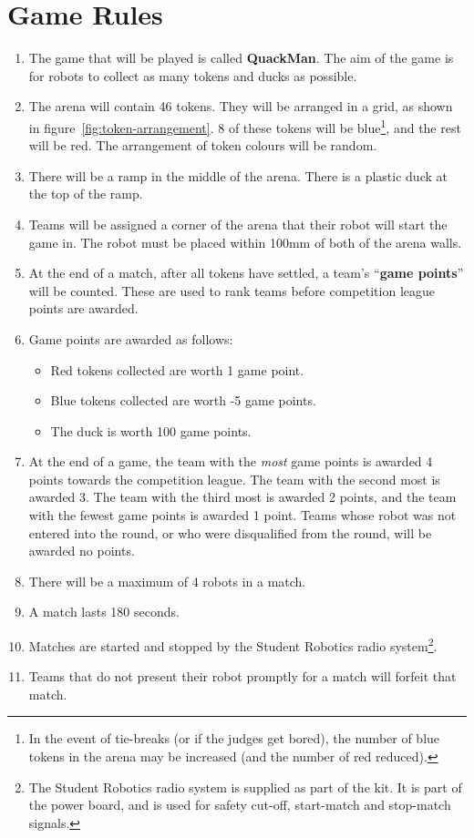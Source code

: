 \section {Game Rules}
\label{game-rules}

\begin{enumerate}
\item The game that will be played is called \textbf{QuackMan}.  The aim of the game is for robots to collect as many tokens and ducks as possible.
\item The arena will contain 46 tokens.  They will be arranged in a grid, as shown in figure~\ref{fig:token-arrangement}.  8 of these tokens will be blue\footnote{In the event of tie-breaks (or if the judges get bored), the number of blue tokens in the arena may be increased (and the number of red reduced).}, and the rest will be red.  The arrangement of token colours will be random.
\item There will be a ramp in the middle of the arena.  There is a plastic duck at the top of the ramp.
\item Teams will be assigned a corner of the arena that their robot will start the game in.  The robot must be placed within 100mm of both of the arena walls.
\item At the end of a match, after all tokens have settled, a team's ``\textbf{game points}'' will be counted.
 These are used to rank teams before competition league points are awarded.

\item Game points are awarded as follows:
\begin{itemize}
\item Red tokens collected are worth 1 game point.
\item Blue tokens collected are worth -5 game points.
\item The duck is worth 100 game points.
\end{itemize}

\item At the end of a game, the team with the \emph{most} game points is awarded 4 points towards the competition league.
 The team with the second most is awarded 3.
 The team with the third most is awarded 2 points, and the team with the fewest game points is awarded 1 point.
 Teams whose robot was not entered into the round, or who were disqualified from the round, will be awarded no points.

\item There will be a maximum of 4 robots in a match.
\item A match lasts 180 seconds.
\item Matches are started and stopped by the Student Robotics radio system\footnote{The Student Robotics radio system is supplied as part of the kit.
 It is part of the power board, and is used for safety cut-off, start-match and stop-match signals.}.
\item Teams that do not present their robot promptly for a match will forfeit that match.
\end{enumerate}

